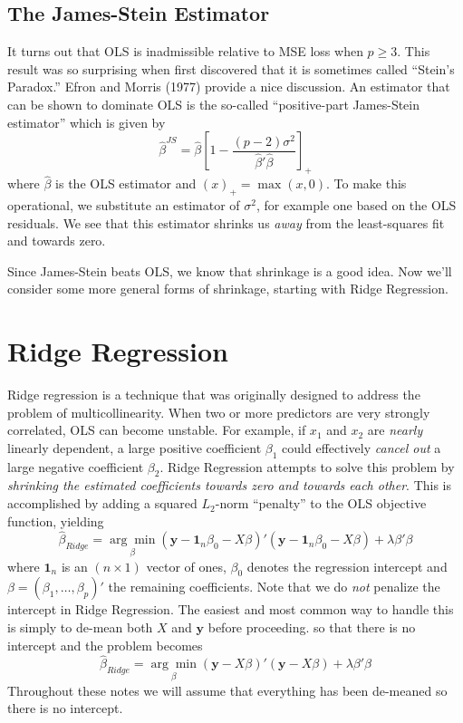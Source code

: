 \documentclass[12pt]{article}
\theoremstyle{definition}
\begin{document}
\subsection{The James-Stein Estimator}
It turns out that OLS is inadmissible relative to MSE loss when $p\geq 3$. This result was so surprising when first discovered that it is sometimes called ``Stein's Paradox.'' Efron and Morris (1977) provide a nice discussion. An estimator that can be shown to dominate OLS is the so-called ``positive-part James-Stein estimator'' which is given by
	$$\widehat{\beta}^{JS} = \widehat{\beta}\left[1 -\frac{(p-2)\sigma^2}{\widehat{\beta}' \widehat{\beta}} \right]_+$$
where $\widehat{\beta}$ is the OLS estimator and $(x)_+ = \max(x,0)$. To make this operational, we substitute an estimator of $\sigma^2$, for example one based on the OLS residuals. We see that this estimator shrinks us \emph{away} from the least-squares fit and towards zero. 

Since James-Stein beats OLS, we know that shrinkage is a good idea. Now we'll consider some more general forms of shrinkage, starting with Ridge Regression.



\section{Ridge Regression} 
Ridge regression is a technique that was originally designed to address the problem of multicollinearity. When two or more predictors are very strongly correlated, OLS can become unstable. For example, if $x_1$ and $x_2$ are \emph{nearly} linearly dependent, a large positive coefficient $\beta_1$ could effectively \emph{cancel out} a large negative coefficient $\beta_2$. Ridge Regression attempts to solve this problem by \emph{shrinking the estimated coefficients towards zero and towards each other}. This is accomplished by adding a squared $L_2$-norm ``penalty'' to the OLS objective function, yielding
	$$\widehat{\beta}_{Ridge} =\underset{\beta}{\arg \min} (\mathbf{y} - \textbf{1}_n\beta_0 - X\beta)' (\mathbf{y} - \textbf{1}_n \beta_0 - X\beta) + \lambda \beta'\beta$$
where $\textbf{1}_n$ is an $(n\times 1)$ vector of ones, $\beta_0$ denotes the regression intercept and $\beta = (\beta_1, \hdots, \beta_p)'$ the remaining coefficients. Note that we do \emph{not} penalize the intercept in Ridge Regression. The easiest and most common way to handle this is simply to de-mean both $X$ and $\mathbf{y}$ before proceeding. so that there is no intercept and the problem becomes
	$$\widehat{\beta}_{Ridge} =\underset{\beta}{\arg \min}(\mathbf{y} - X\beta)' (\mathbf{y} - X\beta) + \lambda \beta'\beta$$
Throughout these notes we will assume that everything has been de-meaned so there is no intercept.
\end{document}
